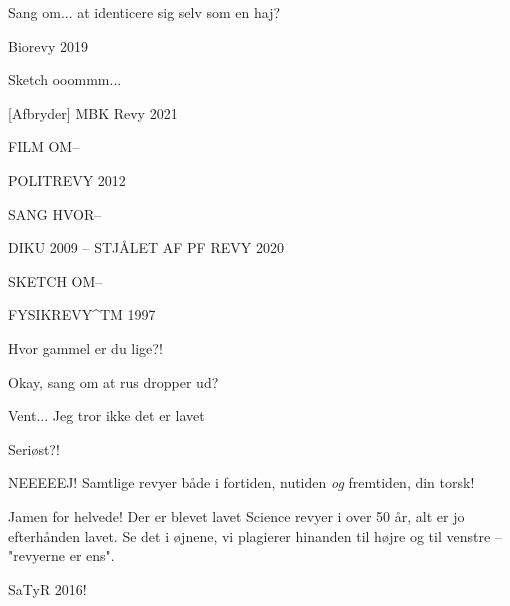 \documentclass[a4paper,11pt]{article}
\begin{document}
\begin{sketch}

 Sang om... at identicere sig selv som en haj?

 Biorevy 2019 %

 Sketch ooommm...

[Afbryder] MBK Revy 2021

 FILM OM-- 

 POLITREVY 2012

 SANG HVOR-- 

 DIKU 2009 -- STJÅLET AF PF REVY 2020

 SKETCH OM-- 

 FYSIKREVY\textasciicircum TM 1997

 Hvor gammel er du lige?!


 Okay, sang om at rus dropper ud?

 Vent...  Jeg tror ikke det er lavet

 Seriøst?!

 NEEEEEJ! Samtlige revyer både i fortiden, nutiden \emph{og} fremtiden, din torsk!

 Jamen for helvede! Der er blevet lavet Science revyer i over 50 år, alt er jo efterhånden lavet. Se det i øjnene, vi plagierer hinanden til højre og til venstre -- "revyerne er ens".

 SaTyR 2016!

\end{sketch}
\end{document}

